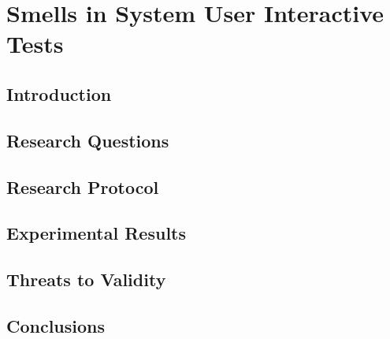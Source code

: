 \chapter{Smells in System User Interactive Tests}
\label{chap:smells-system-user-interactive-test}

\section{Introduction}
\section{Research Questions}
\section{Research Protocol}
\section{Experimental Results}
\section{Threats to Validity}
\section{Conclusions}